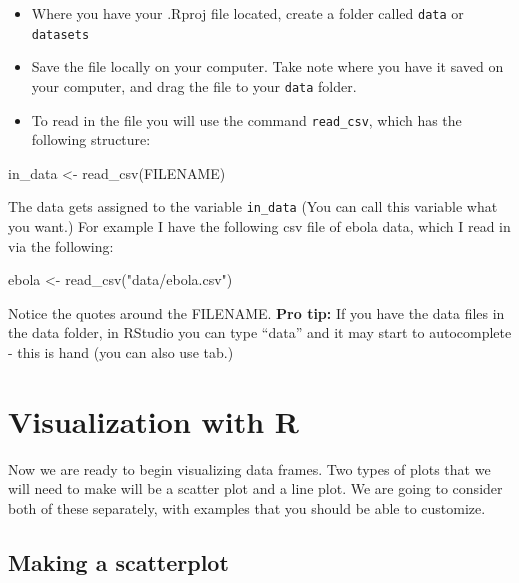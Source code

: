 \documentclass[
]{book}
\newenvironment{Shaded}{\begin{snugshade}}{\end{snugshade}}
\newcommand{\FunctionTok}[1]{\textcolor[rgb]{0.00,0.00,0.00}{#1}}
\newcommand{\NormalTok}[1]{#1}
\newcommand{\OtherTok}[1]{\textcolor[rgb]{0.56,0.35,0.01}{#1}}
\newcommand{\StringTok}[1]{\textcolor[rgb]{0.31,0.60,0.02}{#1}}
\providecommand{\tightlist}{%
  \setlength{\itemsep}{0pt}\setlength{\parskip}{0pt}}
\theoremstyle{definition}
\theoremstyle{definition}
\theoremstyle{definition}
\theoremstyle{remark}
\begin{document}
\begin{itemize}
\tightlist
\item
  Where you have your .Rproj file located, create a folder called \texttt{data} or \texttt{datasets}
\item
  Save the file locally on your computer. Take note where you have it saved on your computer, and drag the file to your \texttt{data} folder.
\item
  To read in the file you will use the command \texttt{read\_csv}, which has the following structure:
\end{itemize}

\begin{Shaded}
\begin{Highlighting}[]
\NormalTok{in\_data }\OtherTok{\textless{}{-}} \FunctionTok{read\_csv}\NormalTok{(FILENAME)}
\end{Highlighting}
\end{Shaded}

The data gets assigned to the variable \texttt{in\_data} (You can call this variable what you want.) For example I have the following csv file of ebola data, which I read in via the following:

\begin{Shaded}
\begin{Highlighting}[]
\NormalTok{ebola }\OtherTok{\textless{}{-}} \FunctionTok{read\_csv}\NormalTok{(}\StringTok{"data/ebola.csv"}\NormalTok{)}
\end{Highlighting}
\end{Shaded}

Notice the quotes around the FILENAME. \textbf{Pro tip:} If you have the data files in the data folder, in RStudio you can type ``data'' and it may start to autocomplete - this is hand (you can also use tab.)

\hypertarget{visualization-with-r}{%
\section{Visualization with R}\label{visualization-with-r}}

Now we are ready to begin visualizing data frames. Two types of plots that we will need to make will be a scatter plot and a line plot. We are going to consider both of these separately, with examples that you should be able to customize.

\hypertarget{making-a-scatterplot}{%
\subsection{Making a scatterplot}\label{making-a-scatterplot}}
\end{document}
